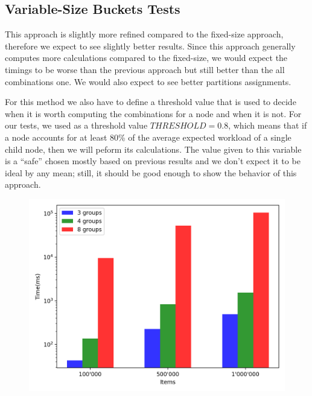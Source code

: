 
\subsection{Variable-Size Buckets Tests}\label{sec:variable-size buckets-tests}
This approach is slightly more refined compared to the fixed-size approach, therefore we expect to see slightly better results. Since this approach generally computes more calculations compared to the fixed-size, we would expect the timings to be worse than the previous approach but still better than the all combinations one. We would also expect to see better partitions assignments.

For this method we also have to define a threshold value that is used to decide when it is worth computing the combinations for a node and when it is not. For our tests, we used as a threshold value $THRESHOLD = 0.8$, which means that if a node accounts for at least 80\% of the average expected workload of a single child node, then we will peform its calculations. The value given to this variable is a ``safe'' chosen mostly based on previous results and we don't expect it to be ideal by any mean; still, it should be good enough to show the behavior of this approach.

\begin{figure}[!htb]
  \centering
  \includegraphics[width=\textwidth,height=\textheight,keepaspectratio]{img/dynamic.png}
  \caption[caption]{ }
  \label{fig:dynamic}
\end{figure}

